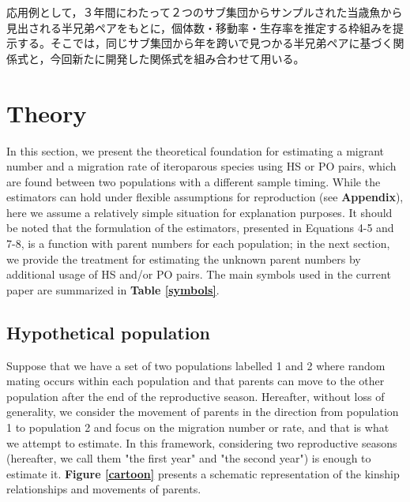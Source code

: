 \documentclass[12pt, English]{article}
\begin{document}
\begin{spacing}{1.9}
応用例として，３年間にわたって２つのサブ集団からサンプルされた当歳魚から見出される半兄弟ペアをもとに，個体数・移動率・生存率を推定する枠組みを提示する。そこでは，同じサブ集団から年を跨いで見つかる半兄弟ペアに基づく関係式と，今回新たに開発した関係式を組み合わせて用いる。

\section{Theory}\label{sec2}
In this section, we present the theoretical foundation for estimating a migrant number and a migration rate of iteroparous species using HS or PO pairs, which are found between two populations with a different sample timing. While the estimators can hold under flexible assumptions for reproduction (see {\bf Appendix}), here we assume a relatively simple situation for explanation purposes. It should be noted that the formulation of the estimators, presented in Equations 4-5 and 7-8, is a function with parent numbers for each population; in the next section, we provide the treatment for estimating the unknown parent numbers by additional usage of HS and/or PO pairs. The main symbols used in the current paper are summarized in {\bf Table \ref{symbols}}. 

\begin{center}
\end{center}

\subsection{Hypothetical population}

Suppose that we have a set of two populations labelled 1 and 2 where random mating occurs within each population and that parents can move to the other population after the end of the reproductive season. Hereafter, without loss of generality, we consider the movement of parents in the direction from population 1 to population 2 and focus on the migration number or rate, and that is what we attempt to estimate. In this framework, considering two reproductive seasons (hereafter, we call them "the first year" and "the second year") is enough to estimate it. {\bf Figure \ref{cartoon}} presents a schematic representation of the kinship relationships and movements of parents. 


\end{spacing}
\end{document}
